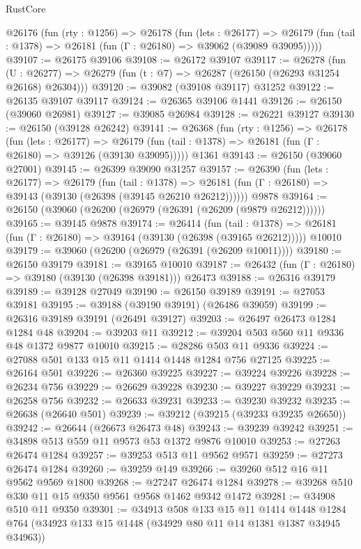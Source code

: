 \begin{lexlean}{RustCore}
\begin{coremodule}
  @26176
    (fun (rty : @1256) =>
    @26178
      (fun (lets : @26177) =>
      @26179 (fun (tail : @1378) => @26181 (fun (Γ : @26180) => @39062 (@39089 @39095)))))
@39107 := @26175 @39106
@39108 := @26172 @39107
@39117 := @26278
    (fun (U : @26277) => @26279 (fun (t : @7) => @26287 (@26150 (@26293 @31254 @26168) @26304)))
@39120 := @39082 (@39108 @39117) @31252
@39122 := @26135 @39107 @39117
@39124 := @26365 @39106 @1441
@39126 := @26150 (@39060 @26981)
@39127 := @39085 @26984
@39128 := @26221 @39127
@39130 := @26150 (@39128 @26242)
@39141 := @26368
    (fun (rty : @1256) =>
    @26178
      (fun (lets : @26177) =>
      @26179 (fun (tail : @1378) => @26181 (fun (Γ : @26180) => @39126 (@39130 @39095)))))
    @1361
@39143 := @26150 (@39060 @27001)
@39145 := @26399 @39090 @31257
@39157 := @26390
    (fun (lets : @26177) =>
    @26179
      (fun (tail : @1378) =>
      @26181 (fun (Γ : @26180) => @39143 (@39130 (@26398 (@39145 @26210 @26212))))))
    @9878
@39164 := @26150 (@39060 (@26200 (@26979 (@26391 (@26209 (@9879 @26212))))))
@39165 := @39145 @9878
@39174 := @26414
    (fun (tail : @1378) => @26181 (fun (Γ : @26180) => @39164 (@39130 (@26398 (@39165 @26212)))))
    @10010
@39179 := @39060 (@26200 (@26979 (@26391 (@26209 @10011))))
@39180 := @26150 @39179
@39181 := @39165 @10010
@39187 := @26432 (fun (Γ : @26180) => @39180 (@39130 (@26398 @39181))) @26473
@39188 := @26316 @39179
@39189 := @39128 @27049
@39190 := @26150 @39189
@39191 := @27053 @39181
@39195 := @39188 (@39190 @39191) (@26486 @39059)
@39199 := @26316 @39189 @39191 (@26491 @39127)
@39203 := @26497 @26473 @1284 @1284 @48
@39204 := @39203 @11
@39212 := @39204 @503 @560 @11 @9336 @48 @1372 @9877 @10010
@39215 := @28286 @503 @11 @9336
@39224 := @27088 @501 @133 @15 @11 @1414 @1448 @1284 @756 @27125
@39225 := @26164 @501
@39226 := @26360 @39225
@39227 := @39224 @39226
@39228 := @26234 @756
@39229 := @26629 @39228
@39230 := @39227 @39229
@39231 := @26258 @756
@39232 := @26633 @39231
@39233 := @39230 @39232
@39235 := @26638 (@26640 @501)
@39239 := @39212 (@39215 (@39233 @39235 @26650))
@39242 := @26644 (@26673 @26473 @48)
@39243 := @39239 @39242
@39251 := @34898 @513 @559 @11 @9573 @53 @1372 @9876 @10010
@39253 := @27263 @26474 @1284
@39257 := @39253 @513 @11 @9562 @9571
@39259 := @27273 @26474 @1284
@39260 := @39259 @149
@39266 := @39260 @512 @16 @11 @9562 @9569 @1800
@39268 := @27247 @26474 @1284
@39278 := @39268 @510 @330 @11 @15 @9350 @9561 @9568 @1462 @9342 @1472
@39281 := @34908 @510 @11 @9350
@39301 := @34913
    @508
    @133
    @15
    @11
    @1414
    @1448
    @1284
    @764
    (@34923 @133 @15 @1448 (@34929 @80 @11 @14 @1381 @1387 @34945 @34963))

\end{coremodule}
\end{lexlean}
